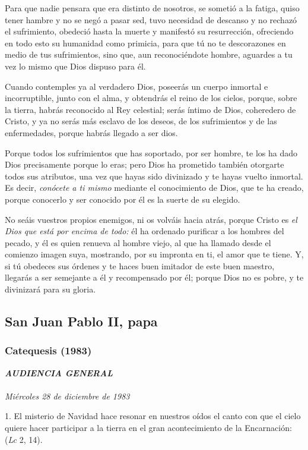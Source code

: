 \begin{body}
\begin{body}
Para que nadie pensara que era distinto de nosotros, se sometió a la fatiga, quiso tener hambre y no se negó a pasar sed, tuvo necesidad de descanso y no rechazó el sufrimiento, obedeció hasta la muerte y manifestó su resurrección, ofreciendo en todo esto su humanidad como primicia, para que tú no te descorazones en medio de tus sufrimientos, sino que, aun reconociéndote hombre, aguardes a tu vez lo mismo que Dios dispuso para él.

Cuando contemples ya al verdadero Dios, poseerás un cuerpo inmortal e incorruptible, junto con el alma, y obtendrás el reino de los cielos, porque, sobre la tierra, habrás reconocido al Rey celestial; serás íntimo de Dios, coheredero de Cristo, y ya no serás más esclavo de los deseos, de los sufrimientos y de las enfermedades, porque habrás llegado a ser dios.

Porque todos los sufrimientos que has soportado, por ser hombre, te los ha dado Dios precisamente porque lo eras; pero Dios ha prometido también otorgarte todos sus atributos, una vez que hayas sido divinizado y te hayas vuelto inmortal. Es decir, \emph{conócete a ti mismo} mediante el conocimiento de Dios, que te ha creado, porque conocerlo y ser conocido por él es la suerte de su elegido.

No seáis vuestros propios enemigos, ni os volváis hacia atrás, porque Cristo es \emph{el Dios que está por encima de todo:} él ha ordenado purificar a los hombres del pecado, y él es quien renueva al hombre viejo, al que ha llamado desde el comienzo imagen suya, mostrando, por su impronta en ti, el amor que te tiene. Y, si tú obedeces sus órdenes y te haces buen imitador de este buen maestro, llegarás a ser semejante a él y recompensado por él; porque Dios no es pobre, y te divinizará para su gloria.


\subsection{San Juan Pablo II, papa}

\subsubsection{Catequesis (1983)} \textbf{\emph{AUDIENCIA GENERAL\\ }}\\ \emph{Miércoles 28 de diciembre de 1983}



1. El misterio de Navidad hace resonar en nuestros oídos el canto con que el cielo quiere hacer participar a la tierra en el gran acontecimiento de la Encarnación:  (\emph{Lc} 2, 14).


\end{body}
\end{body}
